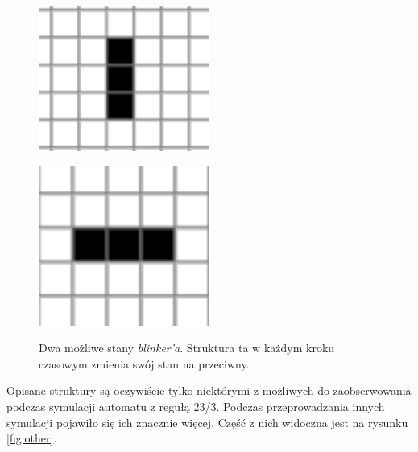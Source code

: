 \documentclass[12pt] {article}
\begin{document}
\begin{figure}[H]
    \begin{minipage}[t]{.5\textwidth}
        \centering
        \includegraphics[width=0.5\textwidth]{res/b1.png}
        \label{fig:b1}
    \end{minipage}
    \hfill
    \begin{minipage}[t]{.5\textwidth}
        \centering
        \includegraphics[width=0.5\textwidth]{res/b2.png}
        \label{fig:b2}
    \end{minipage}
    \caption{Dwa możliwe stany \textit{blinker'a}. Struktura ta w każdym kroku czasowym zmienia swój stan na przeciwny.}
    \label{fig:blinker}
\end{figure}


Opisane struktury są oczywiście tylko niektórymi z możliwych do zaobserwowania podczas symulacji automatu z regułą 23/3. Podczas przeprowadzania innych symulacji pojawiło się ich znacznie więcej. Część z nich widoczna jest na rysunku \ref{fig:other}.
\end{document}
